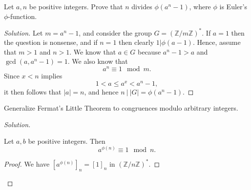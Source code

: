 \documentclass[12pt]{article}
\newenvironment{problem}[2][Problem]{\begin{trivlist}
\item[\hskip \labelsep {\bfseries #1}\hskip \labelsep {\bfseries #2.}]}{\end{trivlist}}
\newenvironment{proposition}[1][Proposition]{\begin{trivlist}
\item[\hskip \labelsep {\bfseries #1.}]}{\end{trivlist}}
\newenvironment{solution}
  {\renewcommand\qedsymbol{$\blacksquare$}\begin{proof}[Solution]}
{\end{proof}}
\newenvironment{sproof}{
  \renewcommand\qedsymbol{$\square$}
  \begin{proof}
  }{
  \end{proof}
}
\theoremstyle{remark}
\begin{document}
\begin{problem}{8.15}
  Let $a,n$ be positive integers.
  Prove that $n$ divides $\phi(a^n-1)$, where $\phi$ is Euler's $\phi$-function.
\end{problem}
\begin{solution}
  Let $m=a^n-1$, and consider the group $G=(\mathbb{Z}/m\mathbb{Z})^*$.
  If $a=1$ then the question is nonsense, and if $n=1$ then clearly $1|\phi(a-1)$.
  Hence, assume that $m>1$ and $n>1$.
  We know that $a\in G$ because $a^n-1>a$ and $\gcd(a,a^n-1)=1$.
  We also know that $$a^n\equiv 1\mod m.$$
  Since $x<n$ implies
  \begin{equation*}
    1 < a \leq a^x < a^n-1,
  \end{equation*}
  it then follows that $|a| = n$, and hence $n~|~|G| = \phi(a^n-1)$.
\end{solution}
\begin{problem}{8.16}
  Generalize Fermat's Little Theorem to congruences modulo arbitrary integers.
\end{problem}
\begin{solution}~
  \begin{proposition}[Euler's Theorem]
    Let $a,b$ be positive integers.
    Then
    \begin{equation*}
      a^{\phi(n)} \equiv 1\mod n.
    \end{equation*}
  \end{proposition}
  \begin{sproof}
    We have $[a^{\phi(n)}]_n = [1]_n$ in $(\mathbb{Z}/n\mathbb{Z})^*$.
  \end{sproof}
\end{solution}
\end{document}
